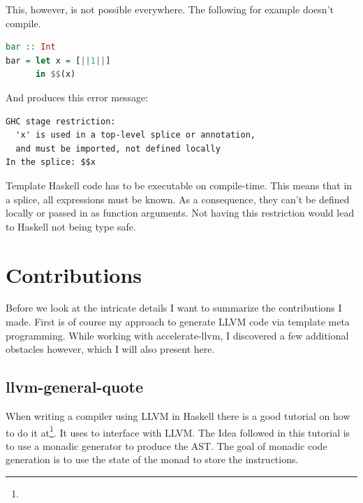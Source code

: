 \documentclass[a4paper,bibliography=totocnumbered,parskip,headsepline]{scrbook}
\begin{document}
This, however, is not possible everywhere.
The following for example doesn't compile.
\begin{lstlisting}[language=haskell]
bar :: Int
bar = let x = [||1||]
      in $$(x)
\end{lstlisting}
And produces this error message:

\begin{minipage}{\textwidth}
\begin{verbatim}
GHC stage restriction:
  'x' is used in a top-level splice or annotation,
  and must be imported, not defined locally
In the splice: $$x
\end{verbatim}
\end{minipage}

Template Haskell code has to be executable on compile-time.
This means that in a splice, all expressions must be known.
As a consequence, they can't be defined locally or passed in as function arguments.
Not having this restriction would lead to Haskell not being type safe.

\chapter{Contributions}
Before we look at the intricate details I want to summarize the contributions I made.
First is of course my approach to generate LLVM code via template meta programming.
While working with accelerate-llvm, I discovered a few additional obstacles however, which I will also present here.

\section{llvm-general-quote}
When writing a compiler using LLVM in Haskell there is a good tutorial on how to do it at\footnote{}.
It uses  to interface with LLVM.
The Idea followed in this tutorial is to use a monadic generator to produce the AST.
The goal of monadic code generation is to use the state of the monad to store the instructions.
\end{document}
